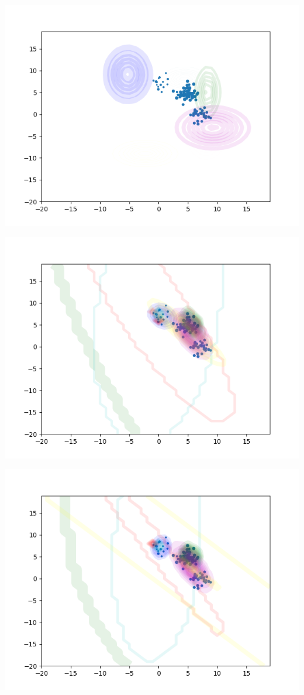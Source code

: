 \documentclass[11pt,a4paper]{article}
\begin{document}
\begin{center}
\includegraphics[width=\textwidth]{1_k=6.png}
\end{center}
\begin{center}
\includegraphics[width=\textwidth]{2_k=6.png}
\end{center}
\begin{center}
\includegraphics[width=\textwidth]{3_k=6.png}
\end{center}
\end{document}
